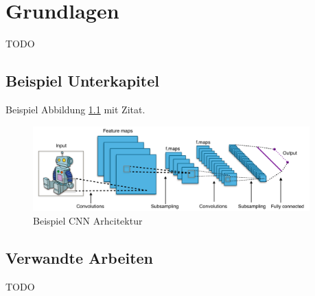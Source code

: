 \chapter{Grundlagen}
TODO

\section{Beispiel Unterkapitel} 
Beispiel Abbildung \ref{img:cnn_example_network} mit Zitat.
\begin{figure}[H]
	\centering
	\includegraphics[width=0.95\textwidth]{resources/cnn/typical_cnn}
	\caption{Beispiel CNN Arhcitektur \cite{typical_cnn_img}}
	\label{img:cnn_example_network}
\end{figure}

\section{Verwandte Arbeiten}
TODO